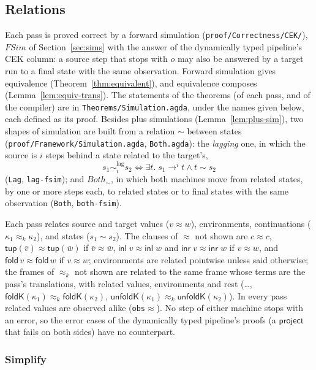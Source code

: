 \documentclass[10pt]{article}
\theoremstyle{acmplain}
\newcommand{\key}[1]{\mathsf{#1}}
\newcommand{\FSim}{\mathit{FSim}}
\newcommand{\tupV}[1]{\key{tup}(#1)}
\newcommand{\inlV}{\key{inl}\;}
\newcommand{\inrV}{\key{inr}\;}
\newcommand{\Kf}[2]{\key{#1}(#2)}
\newcommand{\lto}{\longrightarrow}
\newcommand{\approxk}{\approx_k}
\newcommand{\Mfold}{\key{fold}\,}
\begin{document}
\subsection{Relations}\label{sec:m-cek-rel}

Each pass is proved correct by a forward simulation
(\texttt{proof/Correctness/CEK/}), $\FSim$ of Section~\ref{sec:sims} with
the answer of the dynamically typed pipeline's CEK column: a source step
that stops with $o$ may also be answered by a target run to a final state
with the same observation. Forward simulation gives equivalence
(Theorem~\ref{thm:equivalent}), and equivalence composes
(Lemma~\ref{lem:equiv-trans}). The statements of the theorems (of each
pass, and of the compiler) are in \texttt{Theorems/\allowbreak Simulation.agda},
under the names given below, each defined as its proof. Besides plus simulations
(Lemma~\ref{lem:plus-sim}), two shapes of simulation are built from a
relation $\sim$ between states
(\texttt{proof/Framework/Simulation.agda}, \texttt{Both.agda}): the
\emph{lagging} one, in which the source is $i$ steps behind a state related
to the target's,
\[ s_1 \sim^{\mathrm{lag}}_i s_2 \iff \exists t.\; s_1 \lto^i t \land t \sim s_2 \]
(\texttt{Lag}, \texttt{lag-fsim}); and $\mathit{Both}_\sim$, in which both
machines move from related states, by one or more steps each, to related
states or to final states with the same observation (\texttt{Both},
\texttt{both-fsim}).

Each pass relates source and target values ($v \approx w$), environments,
continuations ($\kappa_1 \approxk \kappa_2$), and states ($s_1 \sim s_2$).
The clauses of $\approx$ not shown are $c \approx c$,
$\tupV{\bar{v}} \approx \tupV{\bar{w}}$ if $\bar{v} \approx \bar{w}$,
$\inlV v \approx \inlV w$ and $\inrV v \approx \inrV w$ if $v \approx w$,
and $\Mfold v \approx \Mfold w$ if $v \approx w$; environments are related
pointwise unless said otherwise; the frames of $\approxk$ not shown are
related to the same frame whose terms are the pass's translations, with
related values, environments and rest (\ldots,
$\Kf{foldK}{\kappa_1} \approxk \Kf{foldK}{\kappa_2}$,
$\Kf{unfoldK}{\kappa_1} \approxk \Kf{unfoldK}{\kappa_2}$). In every pass
related values are observed alike (\texttt{obs$\approx$}). No step of
either machine stops with an error, so the error cases of the dynamically
typed pipeline's proofs (a $\key{project}$ that fails on both sides) have
no counterpart.

\subsubsection{Simplify}
\end{document}
